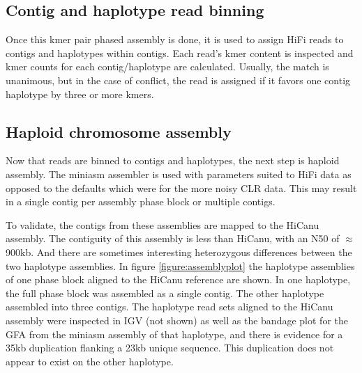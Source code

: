 \subsection{Contig and haplotype read binning}

\par{
Once this kmer pair phased assembly is done, it is used to assign HiFi reads to contigs and haplotypes within contigs. Each read's kmer content is inspected and kmer counts for each contig/haplotype are calculated. Usually, the match is unanimous, but in the case of conflict, the read is assigned if it favors one contig haplotype by three or more kmers. 
}

\subsection{Haploid chromosome assembly}

\par{
Now that reads are binned to contigs and haplotypes, the next step is haploid assembly. The miniasm assembler is used with parameters suited to HiFi data as opposed to the defaults which were for the more noisy CLR data\cite{miniasm}. This may result in a single contig per assembly phase block or multiple contigs. }

\par{ To validate, the contigs from these assemblies are mapped to the HiCanu assembly. The contiguity of this assembly is less than HiCanu, with an N50 of $\approx$900kb. And there are sometimes interesting heterozygous differences between the two haplotype assemblies. In figure \ref{figure:assemblyplot} the haplotype assemblies of one phase block aligned to the HiCanu reference are shown. In one haplotype, the full phase block was assembled as a single contig. The other haplotype assembled into three contigs. The haplotype read sets aligned to the HiCanu assembly were inspected in IGV (not shown) as well as the bandage plot for the GFA from the miniasm assembly of that haplotype, and there is evidence for a 35kb duplication flanking a 23kb unique sequence\cite{bandage}. This duplication does not appear to exist on the other haplotype.
}

